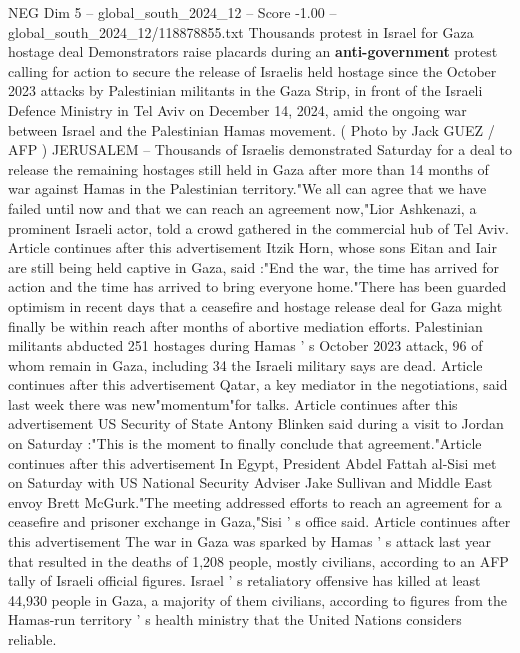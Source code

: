 \begin{textsample}{NEG Dim 5 – global\_south\_2024\_12 – Score -1.00 – global\_south\_2024\_12/118878855.txt}  \label{ex:f5_neg_401}
Thousands protest in Israel for Gaza hostage deal Demonstrators raise placards during an \textbf{anti-government} protest calling for action to secure the release of Israelis held hostage since the October 2023 attacks by Palestinian militants in the Gaza Strip, in front of the Israeli Defence Ministry in Tel Aviv on December 14, 2024, amid the ongoing war between Israel and the Palestinian Hamas movement. ( Photo by Jack GUEZ / AFP ) JERUSALEM -- Thousands of Israelis demonstrated Saturday for a deal to release the remaining hostages still held in Gaza after more than 14 months of war against Hamas in the Palestinian territory."We all can agree that we have failed until now and that we can reach an agreement now,"Lior Ashkenazi, a prominent Israeli actor, told a crowd gathered in the commercial hub of Tel Aviv.
Article continues after this advertisement Itzik Horn, whose sons Eitan and Iair are still being held captive in Gaza, said :"End the war, the time has arrived for action and the time has arrived to bring everyone home."There has been guarded optimism in recent days that a ceasefire and hostage release deal for Gaza might finally be within reach after months of abortive mediation efforts.
Palestinian militants abducted 251 hostages during Hamas ' s October 2023 attack, 96 of whom remain in Gaza, including 34 the Israeli military says are dead.
Article continues after this advertisement Qatar, a key mediator in the negotiations, said last week there was new"momentum"for talks.
Article continues after this advertisement US Security of State Antony Blinken said during a visit to Jordan on Saturday :"This is the moment to finally conclude that agreement."Article continues after this advertisement In Egypt, President Abdel Fattah al-Sisi met on Saturday with US National Security Adviser Jake Sullivan and Middle East envoy Brett McGurk."The meeting addressed efforts to reach an agreement for a ceasefire and prisoner exchange in Gaza,"Sisi ' s office said.
Article continues after this advertisement The war in Gaza was sparked by Hamas ' s attack last year that resulted in the deaths of 1,208 people, mostly civilians, according to an AFP tally of Israeli official figures.
Israel ' s retaliatory offensive has killed at least 44,930 people in Gaza, a majority of them civilians, according to figures from the Hamas-run territory ' s health ministry that the United Nations considers reliable.

\end{textsample}
